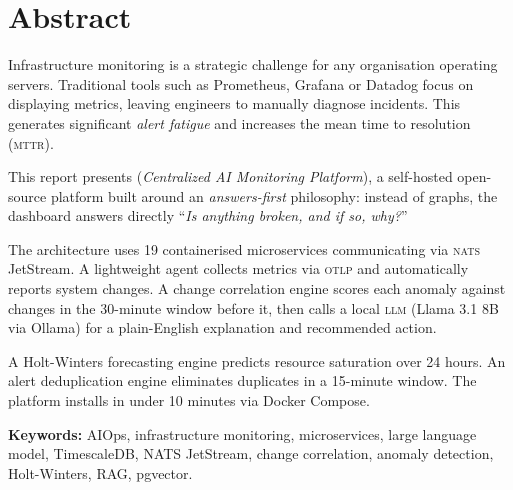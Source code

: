 \vspace{1.5cm}

\chapter*{Abstract}

\begin{infobox}
Infrastructure monitoring is a strategic challenge for any organisation
operating servers. Traditional tools such as Prometheus, Grafana or Datadog
focus on displaying metrics, leaving engineers to manually diagnose incidents.
This generates significant \textit{alert fatigue} and increases the mean time
to resolution (\textsc{mttr}).

This report presents \textbf{\caimp{}} (\textit{Centralized AI Monitoring
Platform}), a self-hosted open-source platform built around an
\textit{answers-first} philosophy: instead of graphs, the dashboard answers
directly ``\textit{Is anything broken, and if so, why?}''

The architecture uses 19 containerised microservices communicating via
\textsc{nats} JetStream. A lightweight agent collects metrics via \textsc{otlp}
and automatically reports system changes. A change correlation engine scores
each anomaly against changes in the 30-minute window before it, then calls a
local \textsc{llm} (Llama 3.1 8B via Ollama) for a plain-English explanation
and recommended action.

A Holt-Winters forecasting engine predicts resource saturation over 24 hours.
An alert deduplication engine eliminates duplicates in a 15-minute window.
The platform installs in under 10 minutes via Docker Compose.
\end{infobox}

\medskip
\textbf{Keywords:} AIOps, infrastructure monitoring, microservices, large
language model, TimescaleDB, NATS JetStream, change correlation, anomaly
detection, Holt-Winters, RAG, pgvector.

